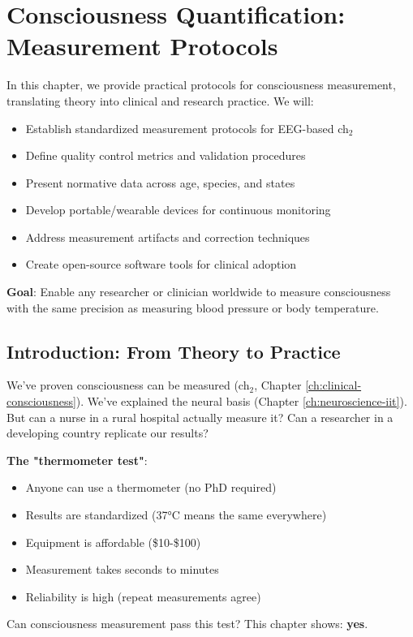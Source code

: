\chapter{Consciousness Quantification: Measurement Protocols}
\label{ch:consciousness-quantification}

\begin{chapterobjectives}
In this chapter, we provide practical protocols for consciousness measurement, translating theory into clinical and research practice. We will:
\begin{itemize}
\item Establish standardized measurement protocols for EEG-based ch$_2$
\item Define quality control metrics and validation procedures
\item Present normative data across age, species, and states
\item Develop portable/wearable devices for continuous monitoring
\item Address measurement artifacts and correction techniques
\item Create open-source software tools for clinical adoption
\end{itemize}

\textbf{Goal}: Enable any researcher or clinician worldwide to measure consciousness with the same precision as measuring blood pressure or body temperature.
\end{chapterobjectives}

\section{Introduction: From Theory to Practice}

\begin{intuitive}
We've proven consciousness can be measured (ch$_2$, Chapter \ref{ch:clinical-consciousness}). We've explained the neural basis (Chapter \ref{ch:neuroscience-iit}). But can a nurse in a rural hospital actually measure it? Can a researcher in a developing country replicate our results?

\textbf{The "thermometer test"}:
\begin{itemize}
\item Anyone can use a thermometer (no PhD required)
\item Results are standardized (37°C means the same everywhere)
\item Equipment is affordable (\$10-\$100)
\item Measurement takes seconds to minutes
\item Reliability is high (repeat measurements agree)
\end{itemize}

Can consciousness measurement pass this test? This chapter shows: \textbf{yes}.
\end{intuitive}

